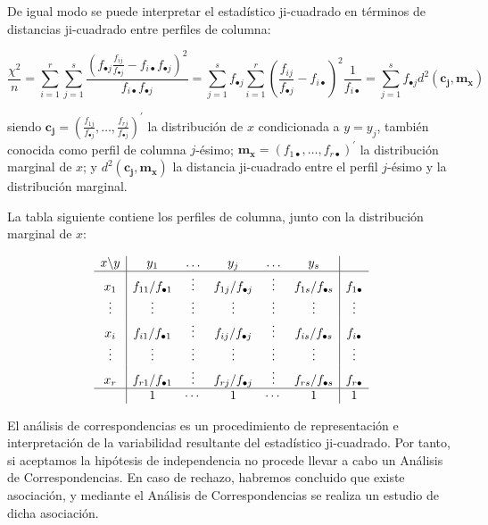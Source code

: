 \documentclass[
  a4paper,
  oneside]{scrbook}
\theoremstyle{definition}
\theoremstyle{definition}
\theoremstyle{definition}
\theoremstyle{definition}
\theoremstyle{remark}
\begin{document}
De igual modo se puede interpretar el estadístico ji-cuadrado en
términos de distancias ji-cuadrado entre perfiles de columna:

\[\frac{\chi^2}{n}=\sum_{i=1}^r\sum_{j=1}^s
\frac{\left(f_{\bullet j}\frac{f_{ij}}{f_{\bullet j}}
-f_{i\bullet}f_{\bullet j}\right)^2}{f_{i\bullet}f_{\bullet j}}
=\sum_{j=1}^s f_{\bullet j} \sum_{i=1}^r
\left(\frac{f_{ij}}{f_{\bullet j}}-f_{i \bullet}\right)^2
\frac{1}{f_{i \bullet}}=\sum_{j=1}^s f_{\bullet j} d^2(\bm{c_j},\bm{m_x})\]

siendo
\(\bm{c_j}=\left(\frac{f_{1j}}{f_{\bullet j}},\ldots,\frac{f_{rj}}{f_{\bullet j}}\right)^\prime{}\)
la distribución de \(x\) condicionada a \(y=y_j\), también conocida como
perfil de columna \(j\)-ésimo;
\(\bm{m_x}=\left(f_{1 \bullet},\ldots,f_{r \bullet}\right)^\prime{}\) la
distribución marginal de \(x\); y \(d^2(\bm{c_j},\bm{m_x})\) la distancia
ji-cuadrado entre el perfil \(j\)-ésimo y la distribución marginal.

La tabla siguiente contiene los perfiles de columna, junto con la
distribución marginal de \(x\):

\[\begin{array}{c|ccccc|c}
x\backslash y & y_1 & \ldots & y_j & \ldots & y_s & \\
\hline x_1 & f_{11}/f_{\bullet 1} & \vdots & f_{1j}/f_{\bullet j} & \vdots & f_{1s}/f_{\bullet s} & f_{1 \bullet} \\
\vdots & \vdots & \vdots & \vdots & \vdots & \vdots & \vdots \\
x_i & f_{i1}/f_{\bullet 1} & \vdots & f_{ij}/f_{\bullet j} & \vdots & f_{is}/f_{\bullet s} & f_{i \bullet} \\
\vdots & \vdots & \vdots & \vdots & \vdots & \vdots & \vdots \\
x_r & f_{r1}/f_{\bullet 1} & \vdots & f_{rj}/f_{\bullet j} & \vdots & f_{rs}/f_{\bullet s} & f_{r \bullet} \\
\hline & 1 & \cdots & 1 & \cdots & 1 & 1 \\
\end{array}\]

El análisis de correspondencias es un procedimiento de representación e
interpretación de la variabilidad resultante del estadístico
ji-cuadrado. Por tanto, si aceptamos la hipótesis de independencia no
procede llevar a cabo un Análisis de Correspondencias. En caso de
rechazo, habremos concluido que existe asociación, y mediante el
Análisis de Correspondencias se realiza un estudio de dicha asociación.
\end{document}
